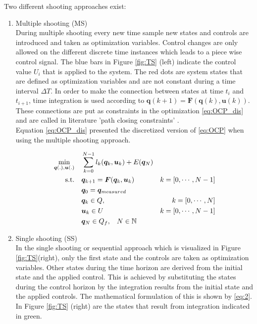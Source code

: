 Two different shooting approaches exist:\\
\begin{enumerate}
	\item Multiple shooting (MS)\\
	During multiple shooting every new time sample new states and controls are introduced and taken as optimization variables.
	Control changes are only allowed on the different discrete time instances which leads to a piece wise control signal. The blue bars in Figure \ref{fig:TS} (left) indicate the control value $U_i$ that is applied to the system.  The red dots are system states that are defined as optimization variables and are not constant during a time interval $\Delta T$. In order to make the connection between states at time $t_i$ and $t_{i+1}$, time integration is used according to $\bm{q}(k+1) = \bm{F}(\bm{q}(k), \bm{u}(k))$. These connections are put as constraints in the optimization \ref{eq:OCP_dis} and are called in literature 'path closing constraints' \cite{Gillis2019}. \\ Equation \ref{eq:OCP_dis} presented the discretized version of \ref{eq:OCP} when using the multiple shooting approach. 

	\begin{equation}
	\label{eq:OCP_dis}
	\begin{aligned}
	\min_{\bm{q}(.),\bm{u}(.)} \quad & \sum_{k = 0}^{N-1}l_{k}(\bm{q}_{k},\bm{u}_{k}) + E(\bm{q}_{N}) \\
	\textrm{s.t.} \quad & \bm{q}_{k+1} = \bm{F}(\bm{q}_{k}, \bm{u}_{k}) & k = [0,\cdots, N-1]\\
	& \bm{q}_{0}= \bm{q}_{measured} \\
	& \bm{q}_{k}\in Q,\hspace{3 mm} & k = [0,\cdots, N]\\
	& \bm{u}_{k}\in U \hspace{3 mm} & k = [0,\cdots, N-1]\\
	& \bm{q}_{N}\in Q_f,\hspace{3 mm} N \in \mathbb{N}
	\end{aligned}
	\end{equation}
	
	\item Single shooting (SS)\\  
	In the single shooting or sequential approach which is visualized in Figure \ref{fig:TS}(right), only the first state and the controls are taken as optimization variables. Other states during the time horizon are derived from the initial state and the applied control. This is achieved by substituting the states during the control horizon by the integration results from the initial state and the applied controls. The mathematical formulation of this is shown by \ref{eq:2}. In Figure \ref{fig:TS} (right) are the states that result from integration indicated in green. \cite{Gillis2019}
	

\end{enumerate}
